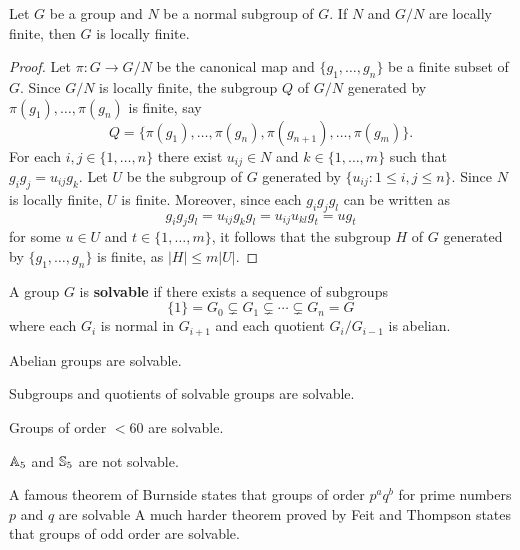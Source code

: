 \begin{proposition}
\label{pro:exact_LI}
	Let $G$ be a group and $N$ be a normal subgroup of $G$. If $N$ and $G/N$
	are locally finite, then $G$ is locally finite.
\end{proposition}

\begin{proof}
	Let $\pi\colon G\to G/N$ be the canonical map and $\{g_1,\dots,g_n\}$ be a finite subset of $G$. 
	Since $G/N$ is locally finite, the subgroup $Q$ of $G/N$ generated by 
	$\pi(g_1),\dots,\pi(g_n)$ is finite, say
	\[
		Q=\{\pi(g_1),\dots,\pi(g_n),\pi(g_{n+1}),\dots,\pi(g_m)\}.
	\]
	For each $i,j\in\{1,\dots,n\}$ there exist $u_{ij}\in N$ and 
	$k\in\{1,\dots,m\}$ such that $g_ig_j=u_{ij}g_k$. Let $U$ be the subgroup of $G$
	generated by $\{u_{ij}:1\leq i,j\leq n\}$. Since $N$ is locally finite, $U$ is finite. Moreover, since 
	each $g_ig_jg_l$ can be written as 
	\[
		g_ig_jg_l=u_{ij}g_kg_l=u_{ij}u_{kl}g_t=ug_t
	\]
	for some $u\in U$ and $t\in\{1,\dots,m\}$, it follows that the subgroup 
	$H$ of $G$ generated by $\{g_1,\dots,g_n\}$ is finite, as 
	$|H|\leq m|U|$. 
\end{proof}

A group $G$ is
\textbf{solvable} if there exists a sequence
of subgroups 
\begin{equation}
	\label{eq:resoluble}
	\{1\}=G_0\subsetneq G_1\subsetneq \cdots\subsetneq G_n=G
\end{equation}
where each $G_i$ is normal in $G_{i+1}$ and each 
quotient $G_i/G_{i-1}$ is
abelian.

\begin{example}
    Abelian groups are solvable. 
\end{example}

Subgroups and quotients of solvable groups are solvable. 

\begin{example}
    Groups of order $<60$ are solvable.
\end{example}

\begin{example}
    $\mathbb{A}_5$ and $\mathbb{S}_5$ are not solvable. 
\end{example}

A famous theorem of Burnside states that 
groups of order $p^aq^b$ for prime numbers $p$ and $q$ are solvable 
A much harder theorem proved by Feit and Thompson states that
groups of odd order are solvable.


